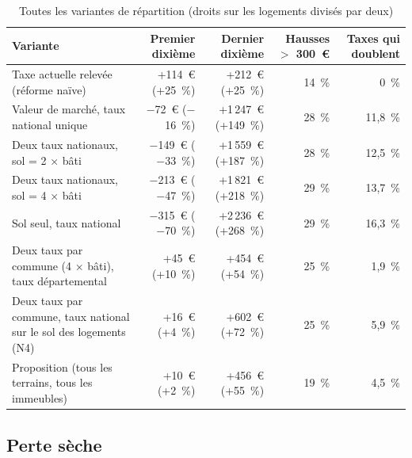 \begin{table}[!htbp]\centering\scriptsize
\caption{Toutes les variantes de répartition (droits sur les logements divisés par deux)}\label{tab:fon_variantes}
\begin{tabularx}{\linewidth}{@{}>{\raggedright\arraybackslash}X rrrr@{}}
\toprule
Variante & Premier dixième & Dernier dixième & Hausses $>$ 300~€ & Taxes qui doublent \\
\midrule
Taxe actuelle relevée (réforme naïve) & +114~€ (+25~\%) & +212~€ (+25~\%) & 14~\% & 0~\% \\
Valeur de marché, taux national unique & $-$72~€ ($-$16~\%) & +1\,247~€ (+149~\%) & 28~\% & 11,8~\% \\
Deux taux nationaux, sol = 2 × bâti & $-$149~€ ($-$33~\%) & +1\,559~€ (+187~\%) & 28~\% & 12,5~\% \\
Deux taux nationaux, sol = 4 × bâti & $-$213~€ ($-$47~\%) & +1\,821~€ (+218~\%) & 29~\% & 13,7~\% \\
Sol seul, taux national & $-$315~€ ($-$70~\%) & +2\,236~€ (+268~\%) & 29~\% & 16,3~\% \\
Deux taux par commune (4 × bâti), taux départemental & +45~€ (+10~\%) & +454~€ (+54~\%) & 25~\% & 1,9~\% \\
Deux taux par commune, taux national sur le sol des logements (N4) & +16~€ (+4~\%) & +602~€ (+72~\%) & 25~\% & 5,9~\% \\
Proposition (tous les terrains, tous les immeubles) & +10~€ (+2~\%) & +456~€ (+55~\%) & 19~\% & 4,5~\% \\
\bottomrule
\end{tabularx}
\par{}
\end{table}


\subsection{Perte sèche}


